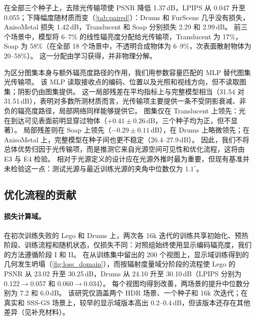 


在全部三个种子上，去除光传输项使 PSNR 降低 1.37\,dB，LPIPS 从 0.047 升至 0.055；下降幅度随材质而变（\cref{tab:paired}）：Drums 和 FurScene 几乎没有损失，AnisoMetal 损失 1.42\,dB，Translucent 和 Soap 分别损失 2.29 和 2.99\,dB。
前三个场景中，模型将 6--7\% 的线性辐亮度分配给光传输项，Translucent 为 17\%，Soap 为 58\%（在全部 18 个场景中，不透明合成物体为 6--9\%，次表面散射物体为 20--58\%）。
这一分配由学习获得，并非物理分解。

为区分图集本身与额外辐亮度路径的作用，我们用参数容量匹配的 MLP 替代图集光传输项。
该 MLP 读取接收点的编码、位置以及光照和视线方向，但不读取图集；阴影仍由图集提供。
这一局部残差在平均指标上与完整模型相当（31.54 对 31.51\,dB），表明对多数所测材质而言，光传输项主要提供一条不受阴影衰减、非负的辐亮度路径，局部网络同样能够提供它。
图集仅在 Translucent 上领先：光在到达可见表面前明显穿过物体（$+0.41\pm0.26$\,dB，三个种子均为正，但不显著）。
局部残差则在 Soap 上领先（$-0.29\pm0.11$\,dB），在 Drums 上略微领先；在 AnisoMetal 上，完整模型在种子间也更不稳定（26.4--27.9\,dB）。
因此，我们不将总体优势归因于光传输项，而是推测它来自光源空间可见性和优化流程，这将由 E3 与 E4 检验。
相对于光源定义的设计应在光源外推时最为重要，但现有基准并未检验这一点：测试光源与最近训练光源的夹角中位数仅为 $1.1^\circ$。




\subsection{优化流程的贡献}
\label{sec:exp_optimization}
\paragraph{损失计算域。}
在初次训练失败的 Lego 和 Drums 上，两次各 16k 迭代的训练共享初始化、预热阶段、训练流程和随机状态，仅损失不同：对照组始终使用显示编码辐亮度，我们的方法遵循阶段 I 和 II。
在从训练集中留出的 200 个视图上，显示域训练得到的几何发生坍塌（\cref{fig:loss_domain}），而按辐射度量域分阶段的流程使 Lego 的 PSNR 从 23.02 升至 30.25\,dB，Drums 从 24.10 升至 30.10\,dB（LPIPS 分别为 0.122$\to$0.057 和 0.060$\to$0.034）。
每个视图均得到改善，两场景的提升中位数分别为 7.2 和 6.0\,dB。
该研究仅涵盖两个 HDR 场景、一个种子和 16k 次迭代；在真实和 SSS-GS 场景上，\ours 较早的显示域版本高出 0.2--0.4\,dB，但该版本还存在其他差异（见补充材料）。

